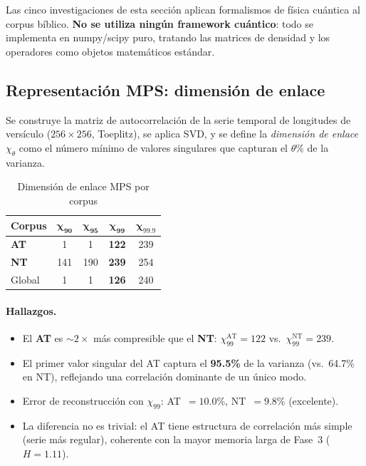 \documentclass[12pt,a4paper]{article}
\newcommand{\ot}{\textcolor{otcolor}{\textbf{AT}}}
\newcommand{\nt}{\textcolor{ntcolor}{\textbf{NT}}}
\newcommand{\val}[1]{\textcolor{hlcolor}{\textbf{#1}}}
\begin{document}
Las cinco investigaciones de esta secci\'on aplican formalismos de f\'isica cu\'antica
al corpus b\'iblico. \textbf{No se utiliza ningún framework cu\'antico}: todo se implementa
en numpy/scipy puro, tratando las matrices de densidad y los operadores como objetos
matem\'aticos est\'andar.

\subsection{Representaci\'on MPS: dimensi\'on de enlace}

Se construye la matriz de autocorrelaci\'on de la serie temporal de longitudes de
vers\'iculo ($256 \times 256$, Toeplitz), se aplica SVD, y se define la
\emph{dimensi\'on de enlace} $\chi_\theta$ como el n\'umero m\'inimo de valores singulares
que capturan el $\theta\%$ de la varianza.

\begin{table}[H]
\centering
\caption{Dimensi\'on de enlace MPS por corpus}
\label{tab:mps}
\begin{tabular}{lcccc}
\toprule
\textbf{Corpus} & $\boldsymbol{\chi_{90}}$ & $\boldsymbol{\chi_{95}}$ & $\boldsymbol{\chi_{99}}$ & $\boldsymbol{\chi_{99.9}}$ \\
\midrule
\ot{}    & 1   & 1   & \val{122} & 239 \\
\nt{}    & 141 & 190 & \val{239} & 254 \\
Global   & 1   & 1   & \val{126} & 240 \\
\bottomrule
\end{tabular}
\end{table}

\paragraph{Hallazgos.}
\begin{itemize}[leftmargin=2em]
\item El \ot{} es $\sim 2\times$ m\'as compresible que el \nt{}: $\chi_{99}^{\text{AT}} = 122$
      vs.\ $\chi_{99}^{\text{NT}} = 239$.
\item El primer valor singular del AT captura el \val{95.5\%} de la varianza (vs.\ 64.7\% en NT),
      reflejando una correlaci\'on dominante de un \'unico modo.
\item Error de reconstrucci\'on con $\chi_{99}$: AT~$=10.0\%$, NT~$=9.8\%$ (excelente).
\item La diferencia no es trivial: el AT tiene estructura de correlaci\'on m\'as simple
      (serie m\'as regular), coherente con la mayor memoria larga de Fase~3 ($H = 1.11$).
\end{itemize}
\end{document}
